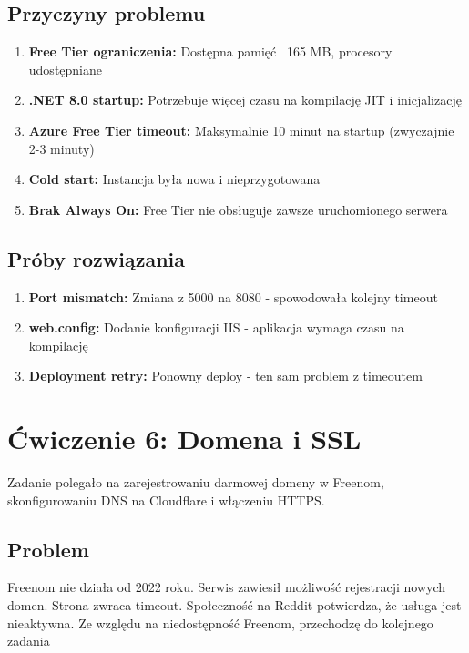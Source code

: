 \documentclass[twoside]{article}
\begin{document}
\subsection{Przyczyny problemu}

\begin{enumerate}
	\item \textbf{Free Tier ograniczenia:} Dostępna pamięć ~165 MB, procesory udostępniane
	\item \textbf{.NET 8.0 startup:} Potrzebuje więcej czasu na kompilację JIT i inicjalizację
	\item \textbf{Azure Free Tier timeout:} Maksymalnie 10 minut na startup (zwyczajnie 2-3 minuty)
	\item \textbf{Cold start:} Instancja była nowa i nieprzygotowana
	\item \textbf{Brak Always On:} Free Tier nie obsługuje zawsze uruchomionego serwera
\end{enumerate}

\subsection{Próby rozwiązania}

\begin{enumerate}
	\item \textbf{Port mismatch:} Zmiana z 5000 na 8080 - spowodowała kolejny timeout
	\item \textbf{web.config:} Dodanie konfiguracji IIS - aplikacja wymaga czasu na kompilację
	\item \textbf{Deployment retry:} Ponowny deploy - ten sam problem z timeoutem
\end{enumerate}

\section{Ćwiczenie 6: Domena i SSL}

Zadanie polegało na zarejestrowaniu darmowej domeny w Freenom, skonfigurowaniu DNS na Cloudflare i włączeniu HTTPS.

\subsection{Problem}

Freenom nie działa od 2022 roku. Serwis zawiesił możliwość rejestracji nowych domen. Strona zwraca timeout. Społeczność na Reddit potwierdza, że usługa jest nieaktywna. Ze względu na niedostępność Freenom, przechodzę do kolejnego zadania
\end{document}
